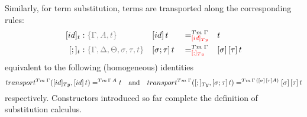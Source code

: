 \documentclass[a4paper,UKenglish,numberwithinsect,cleveref,thm-restate]{lipics-v2021}
\begin{document}
Similarly, for term substitution, terms are transported along the corresponding rules:
\begin{alignat*}{5}
  [\idS]_t         & : \implicit{\Gamma, A, t} && {[\idS]\,t}         && =^{\Tm\;\Gamma}_{\alert{[\idS]_\Ty}}  && t \\
  [;]_t            & : \implicit{\Gamma, \Delta, \Theta, \sigma, \tau, t} && {[\sigma ; \tau]\,t} && =^{\Tm\;\Gamma}_{\alert{[;]_{\Ty}}}   && {[ \sigma ]\,[ \tau ]\,t}
\end{alignat*}
equivalent to the following (homogeneous) identities
\[
  \transfib{\Tm\;\Gamma}{[\idS]_{\Ty}}{[\idS]\,t} =^{\Tm\,\Gamma\,A} t
  \quad\text{and}\quad
  \transfib{\Tm\;\Gamma}{[;]_{\Ty}}{[\sigma;\tau]\,t} =^{\Tm\,\Gamma\,([\sigma]\,[\tau]A)} [\sigma]\,[\tau]\,t
\]
respectively.
Constructors introduced so far complete the definition of substitution calculus.
\end{document}
